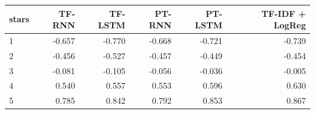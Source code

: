 \begin{tabular}{lrrrrr}
\toprule
stars & TF-RNN & TF-LSTM & PT-RNN & PT-LSTM & TF-IDF + LogReg \\
\midrule
1 & -0.657 & -0.770 & -0.668 & -0.721 & -0.739 \\
2 & -0.456 & -0.527 & -0.457 & -0.449 & -0.454 \\
3 & -0.081 & -0.105 & -0.056 & -0.036 & -0.005 \\
4 & 0.540 & 0.557 & 0.553 & 0.596 & 0.630 \\
5 & 0.785 & 0.842 & 0.792 & 0.853 & 0.867 \\
\bottomrule
\end{tabular}